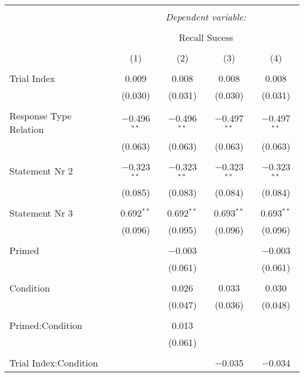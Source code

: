 
\begin{table}[!htbp] \centering
  \caption{}
  \label{table:main2}
  \small
  \renewcommand{\arraystretch}{0.6}
\begin{tabular}{@{\extracolsep{5pt}}lcccc}
\\[-1.8ex]\hline
\hline \\[-1.8ex]
 & \multicolumn{4}{c}{\textit{Dependent variable:}} \\
\cline{2-5}
\\[-1.8ex] & \multicolumn{4}{c}{Recall Sucess} \\
\\[-1.8ex] & (1) & (2) & (3) & (4)\\
\hline \\[-1.8ex]
 Trial Index & 0.009 & 0.008 & 0.008 & 0.008 \\
  & (0.030) & (0.031) & (0.030) & (0.031) \\
  & & & & \\
 Response Type Relation & $-$0.496$^{**}$ & $-$0.496$^{**}$ & $-$0.497$^{**}$ & $-$0.497$^{**}$ \\
  & (0.063) & (0.063) & (0.063) & (0.063) \\
  & & & & \\
 Statement Nr 2 & $-$0.323$^{**}$ & $-$0.323$^{**}$ & $-$0.323$^{**}$ & $-$0.323$^{**}$ \\
  & (0.085) & (0.083) & (0.084) & (0.084) \\
  & & & & \\
 Statement Nr 3 & 0.692$^{**}$ & 0.692$^{**}$ & 0.693$^{**}$ & 0.693$^{**}$ \\
  & (0.096) & (0.095) & (0.096) & (0.096) \\
  & & & & \\
 Primed &  & $-$0.003 &  & $-$0.003 \\
  &  & (0.061) &  & (0.061) \\
  & & & & \\
 Condition &  & 0.026 & 0.033 & 0.030 \\
  &  & (0.047) & (0.036) & (0.048) \\
  & & & & \\
 Primed:Condition &  & 0.013 &  &  \\
  &  & (0.061) &  &  \\
  & & & & \\
 Trial Index:Condition &  &  & $-$0.035 & $-$0.034 \\

\end{tabular}
\end{table}
